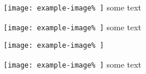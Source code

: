 \texttt{[image: example-image\%
]}
some text

\texttt{[image: example-image\%
]}%
some text

\texttt{[image: example-image\%
]} %

\texttt{[image: example-image\%
]}
some text
